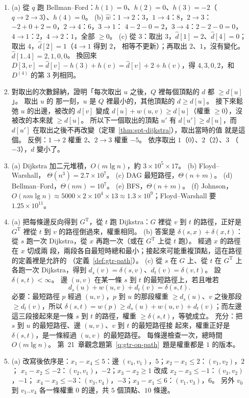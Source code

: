 \begin{enumerate}
\item (a) 從 $q$ 跑 Bellman--Ford：$h(1) = 0$、$h(2) = 0$、$h(3) = -2$（$q \to 2 \to 3$）、$h(4) = 0$。
(b) $\hat{w}$：$1 \to 2$：$3$，$1 \to 4$：$8$，$2 \to 3$：$-2 + 0 + 2 = 0$，$2 \to 4$：$6$，$3 \to 1$：
$4 - 2 - 0 = 2$，$3 \to 4$：$2 - 2 - 0 = 0$，$4 \to 1$：$2$，$4 \to 2$：$1$，全部 $\ge 0$。
(c) 從 $3$：取出 $3$，$\hat{d}[1] = 2$、$\hat{d}[4] = 0$；取出 $4$，$\hat{d}[2] = 1$（$4 \to 1$ 得到 $2$，
相等不更新）；再取出 $2$、$1$，沒有變化。 $\hat{d}[1..4] = 2, 1, 0, 0$。 換回來 $D[3, v] = \hat{d}[v] -
h(3) + h(v) = \hat{d}[v] + 2 + h(v)$，得 $4, 3, 0, 2$，和 $D^{(4)}$ 的第 $3$ 列相同。

\item 對取出的次數歸納，證明「每次取出 $u$ 之後，$Q$ 裡每個頂點的 $d$ 都 $\ge d[u]$」。 取出 $u$ 的
那一刻，$u$ 是 $Q$ 裡最小的，其他頂點的 $d \ge d[u]$。 接下來鬆弛 $u$ 的出邊，被改的 $d[v]$ 變成
$d[u] + w(u, v) \ge d[u]$（權重 $\ge 0$），沒被改的本來就 $\ge d[u]$。 所以下一個取出的頂點 $u'$
有 $d[u'] \ge d[u]$，而 $d[u']$ 在取出之後不再改變（定理~\ref{thm:spt-dijkstra}），取出當時的值
就是這個。 反例：$1 \to 2$ 權重 $2$、$2 \to 3$ 權重 $-5$。 依序取出 $1$（$0$）、$2$（$2$）、$3$
（$-3$），$d$ 變小了。

\item (a) Dijkstra 加二元堆積，$O(m \lg n)$，約 $3 \times 10^5 \times 17$。 (b) Floyd--Warshall，
$\Theta(n^3) = 2.7 \times 10^7$。 (c) DAG 最短路徑，$\Theta(n + m)$。 (d) Bellman--Ford，$\Theta(nm)
= 10^7$。 (e) BFS，$\Theta(n + m)$。 (f) Johnson，$O(nm \lg n) \approx 5000 \times 2 \times 10^4 \times 13
\approx 1.3 \times 10^9$；Floyd--Warshall 要 $1.25 \times 10^{11}$。

\item (a) 把每條邊反向得到 $G^{\mathrm{T}}$，從 $t$ 跑 Dijkstra：$G$ 裡從 $v$ 到 $t$ 的路徑，正好是
$G^{\mathrm{T}}$ 裡從 $t$ 到 $v$ 的路徑倒過來，權重相同。 (b) 答案是 $\delta(s, x) + \delta(x, t)$：從
$s$ 跑一次 Dijkstra，從 $x$ 再跑一次（或在 $G^{\mathrm{T}}$ 上從 $t$ 跑）。 經過 $x$ 的路徑在 $x$ 切成兩
段，兩段各自最短時總和最小；接起來可能重複頂點，這在路徑的定義裡是允許的
（定義~\ref{def:gtr-path}）。 (c) 從 $s$ 在 $G$ 上、從 $t$ 在 $G^{\mathrm{T}}$ 上各跑一次 Dijkstra，得到
$d_s(v) = \delta(s, v)$、$d_t(v) = \delta(v, t)$。 設 $\delta(s, t) < \infty$。 邊 $(u, v)$ 在某一條 $s$
到 $t$ 的最短路徑上，若且唯若
\[
d_s(u) + w(u, v) + d_t(v) = \delta(s, t).
\]
必要：最短路徑 $p$ 經過 $(u, v)$，$p$ 到 $u$ 的那段權重 $\ge d_s(u)$、$v$ 之後那段 $\ge d_t(v)$，所以
$\delta(s, t) = w(p) \ge d_s(u) + w(u, v) + d_t(v)$；而左邊這三段接起來是一條 $s$ 到 $t$ 的路徑，權重
$\ge \delta(s, t)$，等號成立。 充分：把 $s$ 到 $u$ 的最短路徑、邊 $(u, v)$、$v$ 到 $t$ 的最短路徑接
起來，權重正好是 $\delta(s, t)$，是一條經過 $(u, v)$ 的最短路徑。 每條邊檢查一次，總時間
$O(m \lg n)$。 第~21~章觀念題第~\ref{q:gtr-on-path}~題是權重都是 $1$ 的版本。
\item (a) 改寫後依序是：$x_1 - x_4 \le 5$：邊 $(v_4, v_1)$，$5$；$x_2 - x_1 \le 2$：$(v_1, v_2)$，$2$；
$x_1 - x_2 \le -2$：$(v_2, v_1)$，$-2$；$x_3 - x_2 \ge 1$ 改成 $x_2 - x_3 \le -1$：$(v_3, v_2)$，$-1$；
$x_4 - x_3 \le -3$：$(v_3, v_4)$，$-3$；$x_3 - x_1 \le 6$：$(v_1, v_3)$，$6$。 另外 $v_0$ 到 $v_1..v_4$
各一條權重 $0$ 的邊，共 $5$ 個頂點、$10$ 條邊。


\end{enumerate}
